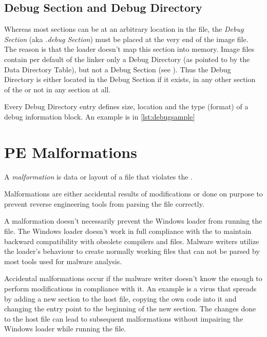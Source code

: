 \subsection*{Debug Section and Debug Directory}

Whereas most sections can be at an arbitrary location in the file, the \emph{Debug Section} (aka \emph{.debug Section}) must be placed at the very end of the image file. The reason is that the loader doesn't map this section into memory. Image files contain per default of the linker only a Debug Directory (as pointed to by the Data Directory Table), but not a Debug Section (see \cite[]{pespec}). Thus the Debug Directory is either located in the Debug Section if it exists, in any other section of the \PE{} or not in any section at all.

Every Debug Directory entry defines \ia{} size, location and the type (format) of a debug information block. An example is in \autoref{lst:debugsample}



\section{PE Malformations}

\begin{definition}[Malformation]
A \emph{malformation} is data or layout of a \PE{} file that violates the \PECOFF{}.
\end{definition} 

Malformations are either accidental results of \PE{} modifications or done on purpose to prevent reverse engineering tools from parsing the file correctly.

A malformation doesn't necessarily prevent the Windows loader from running the file. The Windows loader doesn't work in full compliance with the \PECOFF{} to maintain backward compatibility with obsolete compilers and files. Malware writers utilize the loader's behaviour to create normally working \PE{} files that can not be parsed by most tools used for malware analysis. 

Accidental malformations occur if the malware writer doesn't know the \PECOFF{} enough to perform modifications in compliance with it. An example is a virus that spreads by adding a new section to the host file, copying the own code into it and changing the entry point to the beginning of the new section. The changes done to the host file can lead to subsequent malformations without impairing the Windows loader while running the file.

